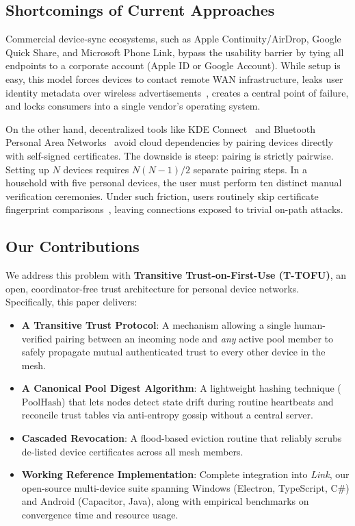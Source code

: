 \documentclass[conference]{IEEEtran}
\begin{document}
\subsection{Shortcomings of Current Approaches}
Commercial device-sync ecosystems, such as Apple Continuity/AirDrop, Google Quick Share, and Microsoft Phone Link, bypass the usability barrier by tying all endpoints to a corporate account (Apple ID or Google Account). While setup is easy, this model forces devices to contact remote WAN infrastructure, leaks user identity metadata over wireless advertisements~\cite{celosia2020discontinued,stute2019billion}, creates a central point of failure, and locks consumers into a single vendor's operating system.

On the other hand, decentralized tools like KDE Connect~\cite{kdeconnect} and Bluetooth Personal Area Networks~\cite{antonioli2023bluffs} avoid cloud dependencies by pairing devices directly with self-signed certificates. The downside is steep: pairing is strictly pairwise. Setting up $N$ devices requires $N(N-1)/2$ separate pairing steps. In a household with five personal devices, the user must perform ten distinct manual verification ceremonies. Under such friction, users routinely skip certificate fingerprint comparisons~\cite{neef2022ohsshit}, leaving connections exposed to trivial on-path attacks.

\subsection{Our Contributions}
We address this problem with \textbf{Transitive Trust-on-First-Use (T-TOFU)}, an open, coordinator-free trust architecture for personal device networks. Specifically, this paper delivers:
\begin{itemize}
    \item \textbf{A Transitive Trust Protocol}: A mechanism allowing a single human-verified pairing between an incoming node and \textit{any} active pool member to safely propagate mutual authenticated trust to every other device in the mesh.
    \item \textbf{A Canonical Pool Digest Algorithm}: A lightweight hashing technique ($\text{PoolHash}$) that lets nodes detect state drift during routine heartbeats and reconcile trust tables via anti-entropy gossip without a central server.
    \item \textbf{Cascaded Revocation}: A flood-based eviction routine that reliably scrubs de-listed device certificates across all mesh members.
    \item \textbf{Working Reference Implementation}: Complete integration into \textit{Link}, our open-source multi-device suite spanning Windows (Electron, TypeScript, C\#) and Android (Capacitor, Java), along with empirical benchmarks on convergence time and resource usage.
\end{itemize}
\end{document}
